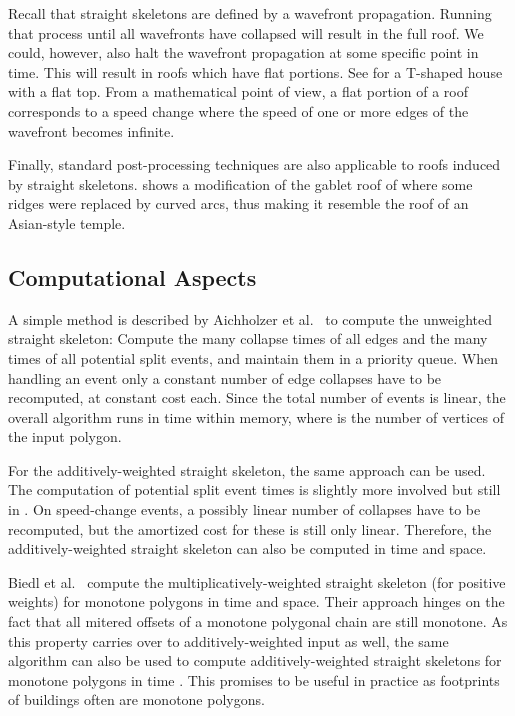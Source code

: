 \documentclass[preprint]{elsarticle}
\begin{document}
Recall that straight skeletons are defined by a wavefront
propagation. Running that process until all wavefronts have collapsed will
result in the full roof. We could, however, also halt the wavefront
propagation at some specific point in time. This will result in roofs which
have flat portions. See  for a T-shaped house with a flat
top. From a mathematical point of view, a flat portion of a roof corresponds
to a speed change where the speed of one or more edges of the wavefront
becomes infinite.

Finally, standard post-processing techniques are also applicable to roofs
induced by straight skeletons.  shows a modification
of the gablet roof of  where some ridges were replaced by
curved arcs, thus making it resemble the roof of an Asian-style temple.


\subsection{Computational Aspects}

A simple method is described by Aichholzer et al.~\cite{Aic&95} to compute the
unweighted straight skeleton: Compute the  many collapse times of
all edges and the  many times of all potential split events,
and maintain them in a priority queue.  When handling an event only a
constant number of edge collapses have to be recomputed, at constant cost each.
Since the total number of events is linear, the overall algorithm runs in
 time within  memory, where  is the number
of vertices of the input polygon.

For the additively-weighted straight skeleton, the same approach can be
used. The computation of potential split event times is slightly more
involved but still in .   On speed-change events, a possibly
linear number of collapses have to be recomputed, but the amortized cost
for these is still only linear.  Therefore, the additively-weighted
straight skeleton can also be computed in  time and
 space.

Biedl et al.~\cite{Bie&15b} compute the
multiplicatively-weighted straight skeleton (for positive weights) for
monotone polygons in  time and 
space.  Their approach hinges on the fact that all mitered offsets of a
monotone polygonal chain are still monotone.  As this property carries
over to additively-weighted input as well, the same algorithm can also
be used to compute additively-weighted straight skeletons for monotone
polygons in time .  This promises to be useful in
practice as footprints of buildings often are monotone polygons.
\end{document}
